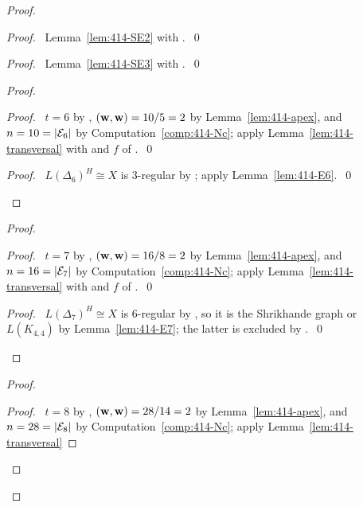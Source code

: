 \begin{proof}
 \begin{proof}\pf\ Lemma~\ref{lem:414-SE2} with .~\qed\end{proof}
 \begin{proof}\pf\ Lemma~\ref{lem:414-SE3} with .~\qed\end{proof}
 \begin{proof}
  \begin{proof}\pf\ $t=6$ by , $({\mathbf w},{\mathbf w})=10/5=2$ by Lemma~\ref{lem:414-apex}, and
   $n=10=|\mathcal E_6|$ by Computation~\ref{comp:414-Nc}; apply Lemma~\ref{lem:414-transversal} with
    and $f$ of .~\qed\end{proof}
  \qedstep
  \begin{proof}\pf\ $L(\Delta_6)^H\cong X$ is 3-regular by ; apply
   Lemma~\ref{lem:414-E6}.~\qed\end{proof}
 \end{proof}
 \begin{proof}
  \begin{proof}\pf\ $t=7$ by , $({\mathbf w},{\mathbf w})=16/8=2$ by Lemma~\ref{lem:414-apex},
   and $n=16=|\mathcal E_7|$ by Computation~\ref{comp:414-Nc}; apply Lemma~\ref{lem:414-transversal}
   with  and $f$ of .~\qed\end{proof}
  \qedstep
  \begin{proof}\pf\ $L(\Delta_7)^H\cong X$ is 6-regular by , so it is the
   Shrikhande graph or $L(K_{4,4})$ by Lemma~\ref{lem:414-E7}; the latter is excluded by
   .~\qed\end{proof}
 \end{proof}
 \begin{proof}
  \begin{proof}\pf\ $t=8$ by , $({\mathbf w},{\mathbf w})=28/14=2$ by Lemma~\ref{lem:414-apex},
   and $n=28=|\mathcal E_8|$ by Computation~\ref{comp:414-Nc}; apply Lemma~\ref{lem:414-transversal}

\end{proof}
\end{proof}
\end{proof}
